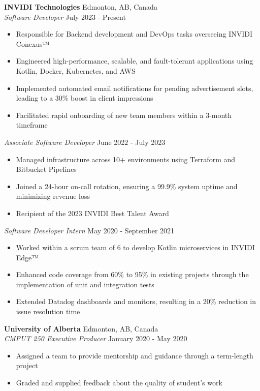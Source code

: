 \documentclass[a4paper]{article}
\begin{document}
\textbf{INVIDI Technologies} \hfill Edmonton, AB, Canada\\
\textit{Software Developer} \hfill July 2023 - Present\\
\vspace{-1mm}
\begin{itemize} \itemsep 1pt
	\item Responsible for Backend development and DevOps tasks overseeing INVIDI Conexus™
	\item Engineered high-performance, scalable, and fault-tolerant applications using Kotlin, Docker, Kubernetes, and AWS
	\item Implemented automated email notifications for pending advertisement slots, leading to a 30\% boost in client impressions
    \item Facilitated rapid onboarding of new team members within a 3-month timeframe
\end{itemize}
\textit{Associate Software Developer} \hfill June 2022 - July 2023\\
\vspace{-1mm}
\begin{itemize} \itemsep 1pt
    \item Managed infrastructure across 10+ environments using Terraform and Bitbucket Pipelines
	\item Joined a 24-hour on-call rotation, ensuring a 99.9\% system uptime and minimizing revenue loss
    \item Recipient of the 2023 INVIDI Best Talent Award
\end{itemize}
\textit{Software Developer Intern} \hfill May 2020 - September 2021\\
\vspace{-1mm}
\begin{itemize} \itemsep 1pt
	\item Worked within a scrum team of 6 to develop Kotlin microservices in INVIDI Edge™
	\item Enhanced code coverage from 60\% to 95\% in existing projects through the implementation of unit and integration tests
	\item Extended Datadog dashboards and monitors, resulting in a 20\% reduction in issue resolution time
\end{itemize}
\textbf{University of Alberta} \hfill Edmonton, AB, Canada\\
\textit{CMPUT 250 Executive Producer} \hfill January 2020 - May 2020\\
\vspace{-1mm}
\begin{itemize} \itemsep 1pt
    \item Assigned a team to provide mentorship and guidance through a term-length project
	\item Graded and supplied feedback about the quality of student's work
\end{itemize}
\end{document}
